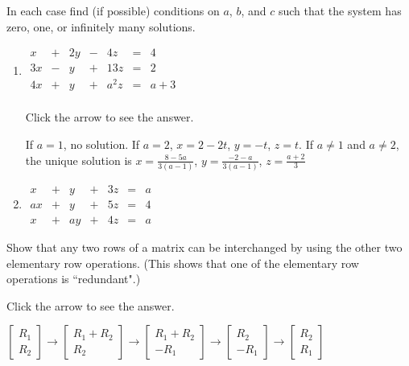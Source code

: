 \documentclass{ximera}
\begin{document}
\begin{problem}\label{prb:no._sol}
In each case find (if possible) conditions on $a$, $b$, and $c$ such that the system has zero, one, or infinitely many solutions.
\begin{enumerate}
\item

$\begin{array}{rlrlrcr}
	  x & + &  2y & - &  4z & = &  4 \\
	 3x & - &   y & + & 13z & = &  2 \\
	 4x & + &   y & + & a^2z & = & a + 3 \\
\end{array}$

Click the arrow to see the answer.
\begin{expandable}
If $a = 1$, no solution. If $a = 2$, $x = 2 - 2t$, $y = -t$, $z = t$. If $a \neq 1$ and $a \neq 2$, the unique  solution is $x = \frac{8 - 5a}{3(a - 1)}$, $y = \frac{-2 - a}{3(a - 1)}$, $z = \frac{a + 2}{3}$
\end{expandable}
\item

$\begin{array}{rlrlrcr}
	  x & + &   y & + &  3z & = &  a \\
	 ax & + &   y & + &  5z & = &  4 \\
	  x & + &  ay & + &  4z & = &  a
\end{array}$
\end{enumerate}
\end{problem}

\begin{problem}\label{prb:elementaryrowops}
Show that any two rows of a matrix can be interchanged by using the other two elementary row operations.  (This shows that one of the elementary row operations is ``redundant".)

Click the arrow to see the answer.
\begin{expandable}
$\begin{bmatrix}
	R_1 \\
	R_2
\end{bmatrix}
\to \begin{bmatrix}
	R_1 + R_2 \\
	R_2
\end{bmatrix}
\to
\begin{bmatrix}
	R_1 + R_2 \\
	-R_1
\end{bmatrix}
\to
\begin{bmatrix}
	R_2 \\
	-R_1
\end{bmatrix}
\to
\begin{bmatrix}
	R_2 \\
	R_1
\end{bmatrix}$
\end{expandable}
\end{problem}
\end{document}
